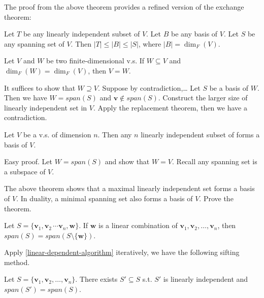 \documentclass[12pt]{article}
\begin{document}
The proof from the above theorem provides a refined version of the exchange theorem:
\begin{theorem}
Let $T$ be any linearly independent subset of $V$.
Let $B$ be any basis of $V$.
Let $S$ be any spanning set of $V$.
Then $|T|\leq|B|\leq|S|$, where $|B|=\dim_F(V)$.
\end{theorem}

\begin{theorem}
    Let $V$ and $W$ be two finite-dimensional v.s. If $W\subseteq V$ and $\dim_F(W)=\dim_F(V)$,
    then $V=W$.
\end{theorem}

\begin{tcolorbox}[boxrule=0.5pt]
\begin{pf}  
It suffices to show that $W\supseteq V$.
Suppose by contradiction,\dots
Let $S$ be a basis of $W$. Then we have $W=span(S)$ and
$\mathbf{v}\notin span(S)$. Construct the larger size of linearly independent set in $V$.
Apply the replacement theorem, then we have a contradiction.
\end{pf}
\end{tcolorbox}


\begin{theorem}
    Let $V$ be a v.s. of dimension $n$.
    Then any $n$ linearly independent subset of forms a basis of $V$.
\end{theorem}

\begin{pf}
Easy proof.
Let $W=span(S)$ and show that $W=V$.
Recall any spanning set is a subspace of $V$.
\end{pf}

\begin{exercise}
    The above theorem shows that a maximal linearly independent set forms a basis of $V$.
    In duality, a minimal spanning set also forms a basis of $V$. Prove the theorem.
\end{exercise}




\begin{theorem}
    Let $S=\{\mathbf{v}_1, \mathbf{v}_2\, \cdots \mathbf{v}_n, \mathbf{w}\}$.
    If $\mathbf{w}$ is a linear combination of $\mathbf{v}_1, \mathbf{v}_2, \ldots, \mathbf{v}_n$,
    then $span(S)=span(S\setminus\{\mathbf{w}\})$.
\end{theorem}


Apply \eqref{linear-dependent-algorithm} iteratively, we have the following sifting method.
\begin{theorem}
    Let $S=\{\mathbf{v}_1,\mathbf{v}_2,\ldots,\mathbf{v}_n\}$.
    There exists $S' \subseteq S$ s.t. $S'$ is linearly independent and $span(S')=span(S)$. 
\end{theorem}
\end{document}
